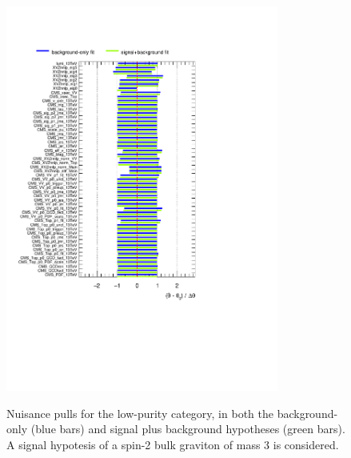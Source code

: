 \begin{figure}[!h]
   \caption{Nuisance pulls for the low-purity category, in both the background-only (blue bars) and signal plus background hypotheses (green bars). A signal hypotesis of a spin-2 bulk graviton of mass 3 \TeV is considered.}
 \begin{center}
   \includegraphics[width=0.8\textwidth]{pulls_VZ_data_1fb/pulls_XZZInv_lp3000.pdf}
   \label{fig:pulls_lp}
 \end{center}
\end{figure}

